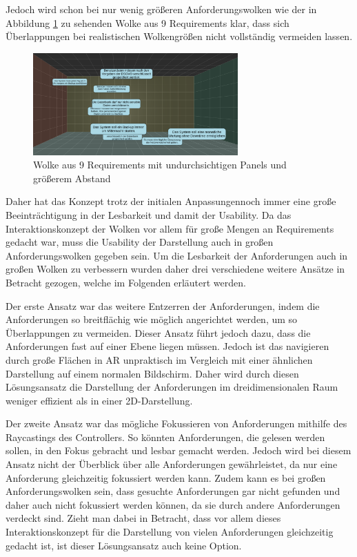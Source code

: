 Jedoch wird schon bei nur wenig größeren Anforderungswolken wie der in Abbildung \ref{fig:wolken-prototyp-3} zu sehenden Wolke aus 9 Requirements klar, dass sich Überlappungen bei realistischen Wolkengrößen nicht vollständig vermeiden lassen.

\begin{figure}[H]
    \centering
    \includegraphics[width=0.7\textwidth]{images/WolkenPrototyp3.png}
    \caption{Wolke aus 9 Requirements mit undurchsichtigen Panels und größerem Abstand}
    \label{fig:wolken-prototyp-3}
\end{figure}

Daher hat das Konzept trotz der initialen Anpassungennoch immer eine große Beeinträchtigung in der Lesbarkeit und damit der Usability.
Da das Interaktionskonzept der Wolken vor allem für große Mengen an Requirements gedacht war, muss die Usability der Darstellung auch in großen Anforderungswolken gegeben sein.
Um die Lesbarkeit der Anforderungen auch in großen Wolken zu verbessern wurden daher drei verschiedene weitere Ansätze in Betracht gezogen, welche im Folgenden erläutert werden.

Der erste Ansatz war das weitere Entzerren der Anforderungen, indem die Anforderungen so breitflächig wie möglich angerichtet werden, um so Überlappungen zu vermeiden.
Dieser Ansatz führt jedoch dazu, dass die Anforderungen fast auf einer Ebene liegen müssen.
Jedoch ist das navigieren durch große Flächen in AR unpraktisch im Vergleich mit einer ähnlichen Darstellung auf einem normalen Bildschirm.
Daher wird durch diesen Lösungsansatz die Darstellung der Anforderungen im dreidimensionalen Raum weniger effizient als in einer 2D-Darstellung.

Der zweite Ansatz war das mögliche Fokussieren von Anforderungen mithilfe des Raycastings des Controllers.
So könnten Anforderungen, die gelesen werden sollen, in den Fokus gebracht und lesbar gemacht werden.
Jedoch wird bei diesem Ansatz nicht der Überblick über alle Anforderungen gewährleistet, da nur eine Anforderung gleichzeitig fokussiert werden kann.
Zudem kann es bei großen Anforderungswolken sein, dass gesuchte Anforderungen gar nicht gefunden und daher auch nicht fokussiert werden können, da sie durch andere Anforderungen verdeckt sind.
Zieht man dabei in Betracht, dass vor allem dieses Interaktionskonzept für die Darstellung von vielen Anforderungen gleichzeitig gedacht ist, ist dieser Lösungsansatz auch keine Option.

